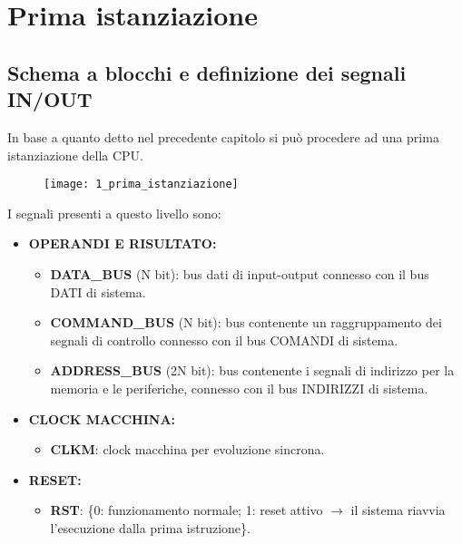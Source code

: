 \chapter{Prima istanziazione}
\section{Schema a blocchi e definizione dei segnali IN/OUT}
In base a quanto detto nel precedente capitolo si può procedere ad una prima istanziazione della CPU.
\begin{figure}[H]
	\centering
	\texttt{[image: 1\_prima\_istanziazione]}
	\label{fig:prima_istanziazione}
\end{figure}
I segnali presenti a questo livello sono:
\begin{itemize}
	\item \textbf{OPERANDI E RISULTATO:}
	\begin{itemize}
		\item \textbf{DATA\_BUS} (N bit): bus dati di input-output connesso con il bus DATI di sistema.
		\item \textbf{COMMAND\_BUS} (N bit): bus contenente un raggruppamento dei segnali di controllo connesso con il bus COMANDI di sistema.
		\item \textbf{ADDRESS\_BUS} (2N bit): bus contenente i segnali di indirizzo per la memoria e le periferiche, connesso con il bus INDIRIZZI di sistema.
	\end{itemize}
	
	\item \textbf{CLOCK MACCHINA:}
	\begin{itemize}
		\item \textbf{CLKM}: clock macchina per evoluzione sincrona.
	\end{itemize}
	
	\item \textbf{RESET:}
	\begin{itemize}
		\item \textbf{RST}: \{0: funzionamento normale; 1: reset attivo $\rightarrow$ il sistema riavvia l'esecuzione dalla prima istruzione\}.
	\end{itemize}
\end{itemize}

